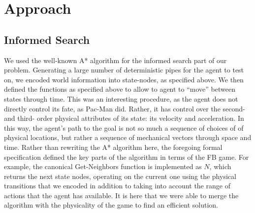 \documentclass[11pt]{article}
\begin{document}
\section{Approach}


\subsection{Informed Search}
We used the well-known A* algorithm for the informed search part of our problem.
Generating a large number of deterministic pipes for the agent to test on, we
encoded world information into state-nodes, as specified above. We then defined
the functions as specified above to allow to agent to ``move'' between states
through time. This was an interesting procedure, as the agent does not directly
control its fate, as Pac-Man did. Rather, it has control over the second- and
third- order physical attributes of its state: its velocity and acceleration.
In this way, the agent's path to the goal is not so much a sequence of choices of
of physical locations, but rather a sequence of mechanical vectors through space
and time. Rather than rewriting the A* algorithm here, the foregoing formal
specification defined the key parts of the algorithm in terms of the FB game.
For example, the canonical Get-Neighbors function is implemented as $N$, which
returns the next state nodes, operating on the current one using the physical
transitions that we encoded in addition to taking into account the range of actions
that the agent has available. It is here that we were able to merge the algorithm
with the physicality of the game to find an efficient solution.
\end{document}
